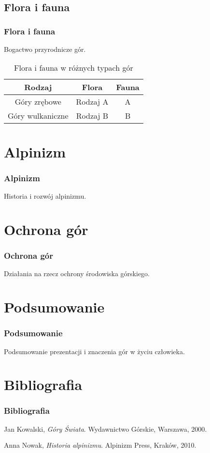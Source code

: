\documentclass{beamer}
\begin{document}
\subsection{Flora i fauna}
\begin{frame}
\frametitle{Flora i fauna}
Bogactwo przyrodnicze gór.
\begin{table}
\centering
\begin{tabular}{|c|c|c|}
\hline
Rodzaj & Flora & Fauna \\
\hline
Góry zrębowe & Rodzaj A & A \\
Góry wulkaniczne & Rodzaj B & B \\
\hline
\end{tabular}
\caption{Flora i fauna w różnych typach gór}
\end{table}
\end{frame}

\section{Alpinizm}
\begin{frame}
\frametitle{Alpinizm}
Historia i rozwój alpinizmu.
\end{frame}

\section{Ochrona gór}
\begin{frame}
\frametitle{Ochrona gór}
Działania na rzecz ochrony środowiska górskiego.
\end{frame}

\section{Podsumowanie}
\begin{frame}
\frametitle{Podsumowanie}
Podsumowanie prezentacji i znaczenia gór w życiu człowieka.
\end{frame}

\section{Bibliografia}
\begin{frame}[allowframebreaks]
\frametitle{Bibliografia}
\begin{thebibliography}{9}
Jan Kowalski, 
\textit{Góry Świata}. 
Wydawnictwo Górskie, Warszawa, 2000.

Anna Nowak, 
\textit{Historia alpinizmu}. 
Alpinizm Press, Kraków, 2010.
\end{thebibliography}
\end{frame}
\end{document}
